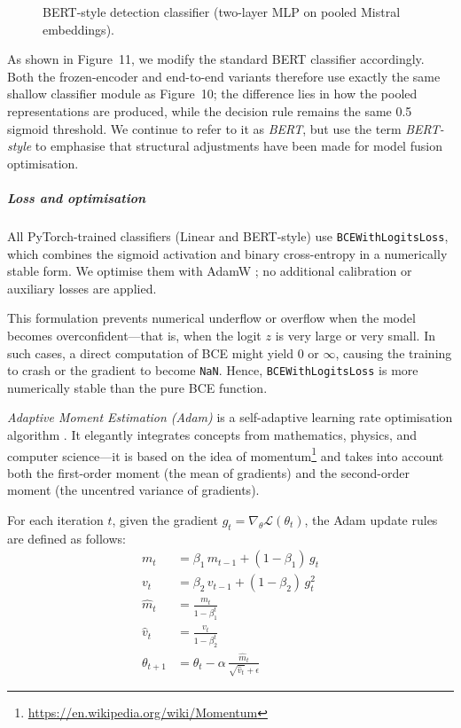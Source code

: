 \documentclass[12pt]{article}
\begin{document}
\begin{figure}[htbp]
\begin{minipage}{1\textwidth}
\begin{adjustwidth}{-2.5cm}{0cm}
\begin{tikzpicture}[node distance=16mm and 22mm, scale=0.9, every node/.style={transform shape}]
\end{tikzpicture}
\end{adjustwidth}
\end{minipage}
\caption{BERT-style detection classifier (two-layer MLP on pooled Mistral embeddings).}
\label{fig:bert-detect-classifier}
\end{figure}

As shown in Figure~11, we modify the standard BERT classifier accordingly. 
Both the frozen-encoder and end-to-end variants therefore use exactly the same shallow classifier module as Figure~10; the difference lies in how the pooled representations are produced, while the decision rule remains the same 0.5 sigmoid threshold.
We continue to refer to it as \textit{BERT}, but use the term \textit{BERT-style} to emphasise that structural adjustments have been made for model fusion optimisation.

\subparagraph{Loss and optimisation}

All PyTorch-trained classifiers (Linear and BERT-style) use \texttt{BCEWithLogitsLoss}, which combines the sigmoid activation and binary cross-entropy in a numerically stable form. 
We optimise them with AdamW \cite{paszke2019pytorch,loshchilov2019adamw}; no additional calibration or auxiliary losses are applied.

This formulation prevents numerical underflow or overflow when the model becomes overconfident\;---\;that is, when the logit $z$ is very large or very small. In such cases, a direct computation of BCE might yield $0$ or $\infty$, causing the training to crash or the gradient to become \texttt{NaN}. Hence, \texttt{BCEWithLogitsLoss} is more numerically stable than the pure BCE function.

\textit{Adaptive Moment Estimation (Adam)} is a self-adaptive learning rate optimisation algorithm \cite{kingma2014adam}. It elegantly integrates concepts from mathematics, physics, and computer science\;---\;it is based on the idea of momentum\footnote{\url{https://en.wikipedia.org/wiki/Momentum}} and takes into account both the first-order moment (the mean of gradients) and the second-order moment (the uncentred variance of gradients).

For each iteration $t$, given the gradient $g_t = \nabla_\theta \mathcal{L}(\theta_t)$,  
the Adam update rules are defined as follows:
\begin{equation}
\begin{aligned}
m_t &= \beta_1 \, m_{t-1} + (1 - \beta_1) \, g_t \\
v_t &= \beta_2 \, v_{t-1} + (1 - \beta_2) \, g_t^2 \\
\hat{m}_t &= \frac{m_t}{1 - \beta_1^t} \\
\hat{v}_t &= \frac{v_t}{1 - \beta_2^t} \\
\theta_{t+1} &= \theta_t - \alpha \, \frac{\hat{m}_t}{\sqrt{\hat{v}_t} + \epsilon}
\end{aligned}
\end{equation}
\end{document}
